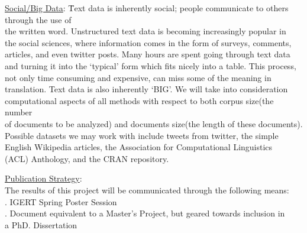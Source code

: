 \documentclass[12pt]{article}
\begin{document}
\begin{flushleft}
		\vspace{2mm}
		\begin{tabbing}
		\underline{Social/Big Data}: \= 
		Text data is inherently social; people communicate to others through the use of \\ \>the written word. Unstructured text data is becoming increasingly popular in \\ \>the social sciences, where information comes in the form of surveys, comments, \\ \>articles, and even twitter posts. Many hours are spent going through text data \\ \>and turning it into the `typical' form which fits nicely into a table. This process, \\ \>not only time consuming and expensive, can miss some of the meaning in \\ \>translation. Text data is also inherently `BIG'. We will take into consideration \\ \>computational aspects of all methods with respect to both corpus size(the number \\ \>of documents to be analyzed) and documents size(the length of these documents).\\ \> Possible datasets we may work with include tweets  from twitter, the simple \\ \>English Wikipedia articles, the Association for Computational Linguistics \\ \>(ACL) Anthology, and the CRAN repository.
		\end{tabbing}
		
		\vspace{2mm}
		\begin{tabbing}
		\underline{Publication Strategy}: \=
		\\  \>The results of this project will be communicated through the following means: \vspace{6mm}
		\\ . IGERT Spring Poster Session
		\\ . Document equivalent to a Master's Project, but geared towards inclusion in \\ \> \hspace{6mm}a PhD. Dissertation 	
		\end{tabbing}
	
	\end{flushleft}
\end{document}
